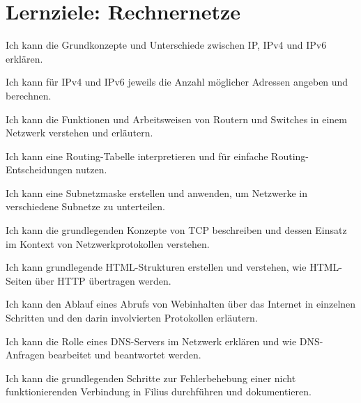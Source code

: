 \section*{Lernziele: Rechnernetze}
\begin{todolist}
\item Ich kann die Grundkonzepte und Unterschiede zwischen IP, IPv4 und IPv6 erklären.
\item Ich kann für IPv4 und IPv6 jeweils die Anzahl möglicher Adressen angeben und berechnen.
\item Ich kann die Funktionen und Arbeitsweisen von Routern und Switches in einem Netzwerk verstehen und erläutern.
\item Ich kann eine Routing-Tabelle interpretieren und für einfache Routing-Entscheidungen nutzen.
\item Ich kann eine Subnetzmaske erstellen und anwenden, um Netzwerke in verschiedene Subnetze zu unterteilen.
\item Ich kann die grundlegenden Konzepte von TCP beschreiben und dessen Einsatz im Kontext von Netzwerkprotokollen verstehen.
\item Ich kann grundlegende HTML-Strukturen erstellen und verstehen, wie HTML-Seiten über HTTP übertragen werden.
\item Ich kann den Ablauf eines Abrufs von Webinhalten über das Internet in einzelnen Schritten und den darin involvierten Protokollen erläutern.
\item Ich kann die Rolle eines DNS-Servers im Netzwerk erklären und wie DNS-Anfragen bearbeitet und beantwortet werden.
\item Ich kann die grundlegenden Schritte zur Fehlerbehebung einer nicht funktionierenden Verbindung in Filius durchführen und dokumentieren.
\end{todolist}
